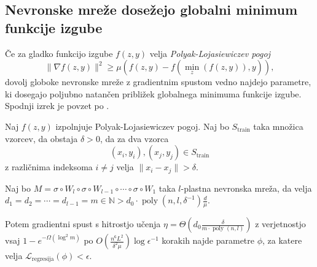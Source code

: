 \documentclass[mat2, tisk]{fmfdelo}
\newcommand{\N}{\mathbb N}
\newcommand{\Loss}[1]{\mathcal L _\text{#1}}
\begin{document}
\subsection{Nevronske mreže dosežejo globalni minimum
funkcije izgube}
Če za gladko funkcijo izgube
$f(z,y)$
velja
\emph{ Polyak-Lojasiewiczev pogoj}
$$
\|\nabla f(z,y)\|^2 \geq \mu (f(z,y) - f(\min_z(f(z,y))  , y)),
$$
dovolj globoke nevronske mreže
z gradientnim spustom vedno najdejo parametre, ki dosegajo
poljubno natančen približek globalnega minimuma funkcije izgube.
Spodnji izrek je povzet po
\cite[stran 6, izrek 1]{allenzhu2019convergencetheorydeeplearning}.
\begin{izrek}
  \label{izrek:allen-zhu-global-minima}
  Naj $f(z,y)$ izpolnjuje Polyak-Lojasiewiczev pogoj.
  Naj bo $S_\text{train}$ taka množica vzorcev, da
  obstaja $\delta > 0$, da za dva vzorca
  $$(x_i, y_i),
  (x_j,y_j) \in S_\text{train}$$
  z različnima indeksoma $i
  \neq j $ velja $\|x_i - x_j\| > \delta$.

  Naj bo $M = \sigma \circ W_l \circ
  \sigma \circ W_{l-1} \circ \dotsm \circ
  \sigma \circ W_1$  taka $l$-plastna
  nevronska mreža, da velja $d_1 = d_2 = \dotsm = d_{l-1}
  = m \in \N > d_0 \cdot \operatorname{poly}(n, l,
  \delta^{-1})\frac{d}{\mu}$.

  Potem gradientni spust s hitrostjo učenja $\eta =
  \Theta (d_0 \frac{\delta}{m \cdot
  \operatorname{poly}(n, l)})$ z verjetnostjo vsaj $1 -
  e^{- \Omega(\log^2 m)}$  po
  $O(\frac{n^6L^2}{\delta^2 \mu})\log\epsilon^{-1}$
  korakih najde parametre $\phi$, za katere velja
  $\Loss{regresija}(\phi) < \epsilon$.
\end{izrek}
\end{document}
